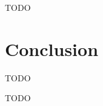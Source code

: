 \documentclass[acmsmall]{acmart}
\begin{document}

TODO %



\section{Conclusion} \label{sec:conclusion}

TODO %


\begin{acks}
    TODO %
\end{acks}




\end{document}
